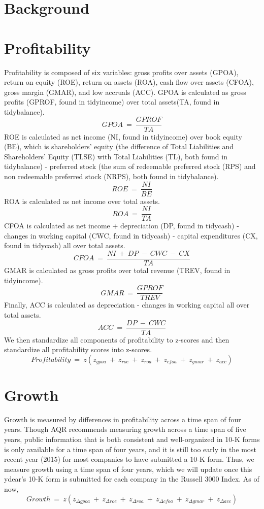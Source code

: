 \documentclass[12pt]{article}
\begin{document}

\section*{Background}
\section*{Profitability}
Profitability is composed of six variables: gross profits over assets (GPOA), return on equity (ROE), return on assets (ROA), cash flow over assets (CFOA), gross margin (GMAR), and low accruals (ACC). GPOA is calculated as gross profits (GPROF, found in tidyincome) over total assets(TA, found in tidybalance). $$GPOA \ = \ \frac{GPROF}{TA}$$ ROE is calculated as net income (NI, found in tidyincome) over book equity (BE), which is shareholders' equity (the difference of Total Liabilities and Shareholders' Equity (TLSE) with Total Liabilities (TL), both found in tidybalance) - preferred stock (the sum of redeemable preferred stock (RPS) and non redeemable preferred stock (NRPS), both found in tidybalance). $$ROE \ = \ \frac{NI}{BE}$$ ROA is calculated as net income over total assets. $$ROA \ = \ \frac{NI}{TA}$$ CFOA is calculated as net income + depreciation (DP, found in tidycash) - changes in working capital (CWC, found in tidycash) - capital expenditures (CX, found in tidycash) all over total assets. $$CFOA \ = \ \frac{NI \ + \ DP \ - \ CWC \ - \ CX}{TA}$$ GMAR is calculated as gross profits over total revenue (TREV, found in tidyincome). $$GMAR \ = \ \frac{GPROF}{TREV}$$ Finally, ACC is calculated as depreciation - changes in working capital all over total assets. $$ACC \ = \ \frac{DP \ - \ CWC}{TA}$$ We then standardize all components of profitability to z-scores and then standardize all profitability scores into z-scores. $$Profitability \ = \ z(z_{gpoa} \ + \ z_{roe} \ + \ z_{roa} \ + \ z_{cfoa} \ + \ z_{gmar} \ + \ z_{acc})$$
\section*{Growth}
Growth is measured by differences in profitability across a time span of four years. Though AQR recommends measuring growth across a time span of five years, public information that is both consistent and well-organized in 10-K forms is only available for a time span of four years, and it is still too early in the most recent year (2015) for most companies to have submitted a 10-K form. Thus, we measure growth using a time span of four years, which we will update once this ydear's 10-K form is submitted for each company in the Russell 3000 Index. As of now, $$Growth \ = \ z(z_{\Delta gpoa} \ + \ z_{\Delta roe} \ + \ z_{\Delta roa} \ + \ z_{\Delta cfoa} \ + \ z_{\Delta gmar} \ + \ z_{\Delta acc})$$
\end{document}
